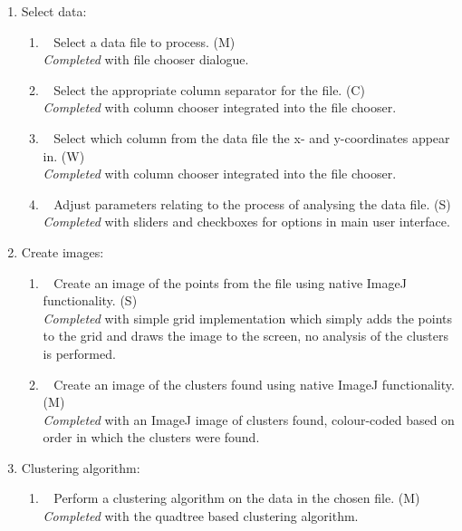 \begin{enumerate}[label=\arabic*.]
	\item Select data:
		\begin{enumerate}[label*=\arabic*.]
			\item~\label{req:a} Select a data file to process. (M) \\
 	 	 	\emph{Completed} with file chooser dialogue.

			\item~\label{req:b} Select the appropriate column separator for the
				file. (C) \\
				\emph{Completed} with column chooser integrated into the file
				chooser.

			\item~\label{req:c} Select which column from the data file the x-
				and y-coordinates appear in. (W) \\
				\emph{Completed} with column chooser integrated into the file
				chooser.

			\item~\label{req:d} Adjust parameters relating to the process of
				analysing the data file. (S) \\
				\emph{Completed} with sliders and checkboxes for options in
				main user interface.

		\end{enumerate}
	\item Create images:
		\begin{enumerate}[label*=\arabic*.]
			\item~\label{req:e} Create an image of the points from the file
				using native ImageJ functionality. (S) \\
				\emph{Completed} with simple grid implementation which simply
				adds the points to the grid and draws the image to the screen,
				no analysis of the clusters is performed.

			\item~\label{req:f} Create an image of the clusters found using
				native ImageJ functionality. (M) \\
				\emph{Completed} with an ImageJ image of clusters found,
				colour-coded based on order in which the clusters were found.

		\end{enumerate}
	\item Clustering algorithm:
		\begin{enumerate}[label*=\arabic*.]
			\item~\label{req:g} Perform a clustering algorithm on the data in
				the chosen file. (M) \\
				\emph{Completed} with the quadtree based clustering algorithm.


\end{enumerate}
\end{enumerate}
